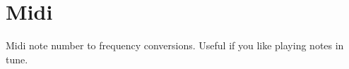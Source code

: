 \hypertarget{group__midi}{}\section{Midi}
\label{group__midi}
Midi note number to frequency conversions. Useful if you like playing notes in tune. 